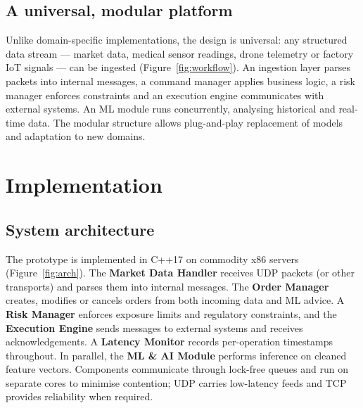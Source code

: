 \documentclass[10pt,a4paper,twocolumn]{article}
\begin{document}
\subsection{A universal, modular platform}
Unlike domain-specific implementations, the design is universal: any structured data
stream --- market data, medical sensor readings, drone telemetry or factory IoT signals ---
can be ingested (Figure~\ref{fig:workflow}). An ingestion layer parses packets into internal
messages, a command manager applies business logic, a risk manager enforces constraints and
an execution engine communicates with external systems. An ML module runs concurrently,
analysing historical and real-time data. The modular structure allows plug-and-play
replacement of models and adaptation to new domains.

\section{Implementation}\label{sec:impl}
\subsection{System architecture}
The prototype is implemented in C++17 on commodity x86 servers (Figure~\ref{fig:arch}). The
\textbf{Market Data Handler} receives UDP packets (or other transports) and parses them into
internal messages. The \textbf{Order Manager} creates, modifies or cancels orders from both
incoming data and ML advice. A \textbf{Risk Manager} enforces exposure limits and
regulatory constraints, and the \textbf{Execution Engine} sends messages to external systems
and receives acknowledgements. A \textbf{Latency Monitor} records per-operation timestamps
throughout. In parallel, the \textbf{ML \& AI Module} performs inference on cleaned feature
vectors. Components communicate through lock-free queues and run on separate cores to
minimise contention; UDP carries low-latency feeds and TCP provides reliability when
required.
\end{document}
